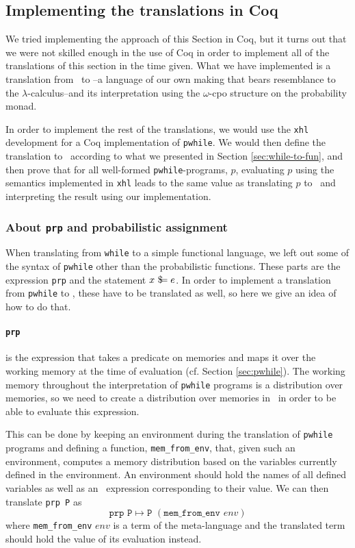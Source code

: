 \documentclass[11pt, leqno, titlepage]{article}
\theoremstyle{definition}
\begin{document}
\subsection{Implementing the translations in Coq}
\label{sec:howto-coq}
We tried implementing the approach of this Section in Coq, but it turns out that we
were not skilled enough in the use of Coq in order to implement all of the
translations of this section in the time given. What we have implemented is a
translation from \rml\ to \srml --a language of our own making that bears resemblance
to the $\lambda$-calculus--and its interpretation using the $\omega$-cpo structure on
the probability monad. 

In order to implement the rest of the translations, we would use the \texttt{xhl}
development for a Coq implementation of \texttt{pwhile}. We would then define the
translation to \rml\ according to what we presented in Section
\ref{sec:while-to-fun}, and then prove that for all well-formed
\texttt{pwhile}-programs, $p$, evaluating $p$ using the semantics implemented in
\texttt{xhl} leads to the same value as translating $p$ to \rml\ and interpreting the
result using our implementation. 

\subsubsection{About \texttt{prp} and probabilistic assignment}
When translating from \texttt{while} to a simple functional language, we left out
some of the syntax of \texttt{pwhile} other than the probabilistic functions. These
parts are the expression \texttt{prp} and the statement $x~\$\hspace{-0.5em}= e$. In order to
implement a translation from \texttt{pwhile} to \rml, these have to be translated as
well, so here we give an idea of how to do that.

\paragraph{\texttt{prp}} is the expression that takes a predicate on memories and
maps it over the working memory at the time of evaluation (cf. Section
\ref{sec:pwhile}). The working memory throughout the interpretation of
\texttt{pwhile} programs is a distribution over memories, so we need to create a
distribution over memories in \rml\ in order to be able to evaluate this expression.

This can be done by keeping an environment during the translation of \texttt{pwhile}
programs and defining a function, \texttt{mem\_from\_env}, that, given such an
environment, computes a memory distribution based on the variables currently defined
in the environment. An environment should hold the names of all defined variables as
well as an \rml\ expression corresponding to their value. We can then translate
\texttt{prp P} as
$$\texttt{prp P} \mapsto \texttt{P } (\texttt{mem\_from\_env } env)$$
where \texttt{mem\_from\_env} $env$ is a term of the meta-language and the translated
term should hold the value of its evaluation instead. 
\end{document}
